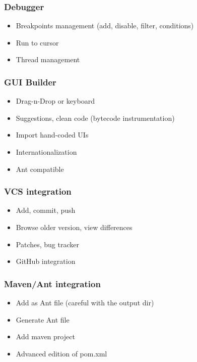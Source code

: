 \begin{frame}
  \frametitle{Debugger}
  \begin{itemize}
    \item Breakpoints management (add, disable, filter, conditions)
    \item Run to cursor
    \item Thread management
  \end{itemize}
\end{frame}

\begin{frame}
  \frametitle{GUI Builder}
  \begin{itemize}
    \item Drag-n-Drop or keyboard
    \item Suggestions, clean code (bytecode instrumentation)
    \item Import hand-coded UIs
    \item Internationalization
    \item Ant compatible
  \end{itemize}
\end{frame}


\begin{frame}
  \frametitle{VCS integration}
  \begin{itemize}
    \item Add, commit, push
    \item Browse older version, view differences
    \item Patches, bug tracker
    \item GitHub integration
  \end{itemize}
\end{frame}

\begin{frame}
  \frametitle{Maven/Ant integration}
      \begin{itemize}
        \item Add as Ant file (careful with the output dir)
        \item Generate Ant file
        \item Add maven project
        \item Advanced edition of pom.xml
      \end{itemize}
\end{frame}

